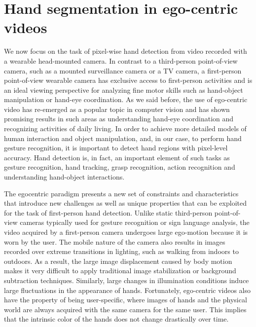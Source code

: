 
\chapter{Hand segmentation in ego-centric videos}


We now focus on the task of pixel-wise hand detection
from video recorded with a wearable head-mounted
camera. In contrast to a third-person point-of-view camera,
such as a mounted surveillance camera or a TV camera,
a first-person point-of-view wearable camera has exclusive
access to first-person activities and is an ideal viewing perspective
for analyzing fine motor skills such as hand-object
manipulation or hand-eye coordination. As we said before, the use of
ego-centric video has re-emerged as a popular topic in computer
vision and has shown promising results in such areas
as understanding hand-eye coordination and recognizing
activities of daily living. In order to achieve more
detailed models of human interaction and object manipulation, and, in our case, to perform hand gesture recognition,
it is important to detect hand regions with pixel-level
accuracy. Hand detection is, in fact, an important element of such
tasks as gesture recognition, hand tracking, grasp recognition,
action recognition and understanding hand-object interactions.

The egocentric
paradigm presents a new set of constraints and characteristics
that introduce new challenges as well as unique
properties that can be exploited for the task of first-person
hand detection. Unlike static third-person point-of-view
cameras typically used for gesture recognition or sign language
analysis, the video acquired by a first-person camera
undergoes large ego-motion because it is worn by the
user. The mobile nature of the camera also results in images
recorded over extreme transitions in lighting, such as
walking from indoors to outdoors. As a result, the large image displacement caused by body motion makes it very difficult
to apply traditional image stabilization or background
subtraction techniques. Similarly, large changes in illumination
conditions induce large fluctuations in the appearance
of hands. Fortunately, ego-centric videos also have the
property of being user-specific, where images of hands and
the physical world are always acquired with the same camera
for the same user. This implies that the intrinsic color
of the hands does not change drastically over time.

